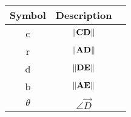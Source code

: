 \begin{tabular}{|c|c|c|}
\hline
Symbol & Description\\
\hline
c & $\left\lVert\mathbf{CD}\right\rVert$ \\
\hline
r & $\left\lVert\mathbf{AD}\right\rVert$ \\
\hline
d & $\left\lVert\mathbf{DE}\right\rVert$\\
\hline
b & $\left\lVert\mathbf{AE}\right\rVert$\\
\hline
$\theta$ & $\angle{\vec{D}}$ \\
\hline
\end{tabular}
